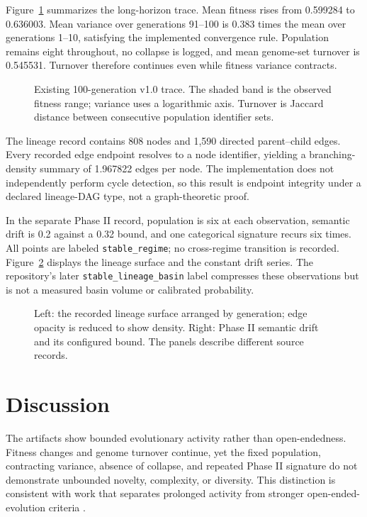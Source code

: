 \documentclass[12pt]{article}
\begin{document}
Figure~\ref{fig:long-horizon} summarizes the long-horizon trace. Mean fitness
rises from 0.599284 to 0.636003. Mean variance over generations 91--100 is
0.383 times the mean over generations 1--10, satisfying the implemented
convergence rule. Population remains eight throughout, no collapse is logged,
and mean genome-set turnover is 0.545531. Turnover therefore continues even
while fitness variance contracts.

\begin{figure}[t]
  \centering
  \resizebox{\textwidth}{!}{}
  \caption{Existing 100-generation v1.0 trace. The shaded band is the observed
  fitness range; variance uses a logarithmic axis. Turnover is Jaccard distance
  between consecutive population identifier sets.}
  \label{fig:long-horizon}
\end{figure}

The lineage record contains 808 nodes and 1,590 directed parent--child edges.
Every recorded edge endpoint resolves to a node identifier, yielding a
branching-density summary of 1.967822 edges per node. The implementation does
not independently perform cycle detection, so this result is endpoint
integrity under a declared lineage-DAG type, not a graph-theoretic proof.

In the separate Phase II record, population is six at each observation,
semantic drift is 0.2 against a 0.32 bound, and one categorical signature
recurs six times. All points are labeled \texttt{stable\_regime}; no
cross-regime transition is recorded. Figure~\ref{fig:lineage-phase2} displays
the lineage surface and the constant drift series. The repository's later
\texttt{stable\_lineage\_basin} label compresses these observations but is not
a measured basin volume or calibrated probability.

\begin{figure}[t]
  \centering
  \resizebox{\textwidth}{!}{}
  \caption{Left: the recorded lineage surface arranged by generation; edge
  opacity is reduced to show density. Right: Phase II semantic drift and its
  configured bound. The panels describe different source records.}
  \label{fig:lineage-phase2}
\end{figure}

\section{Discussion}

The artifacts show bounded evolutionary activity rather than open-endedness.
Fitness changes and genome turnover continue, yet the fixed population,
contracting variance, absence of collapse, and repeated Phase II signature do
not demonstrate unbounded novelty, complexity, or diversity. This distinction
is consistent with work that separates prolonged activity from stronger
open-ended-evolution criteria \citep{taylor2016,dolson2019,hintze2019}.
\end{document}
